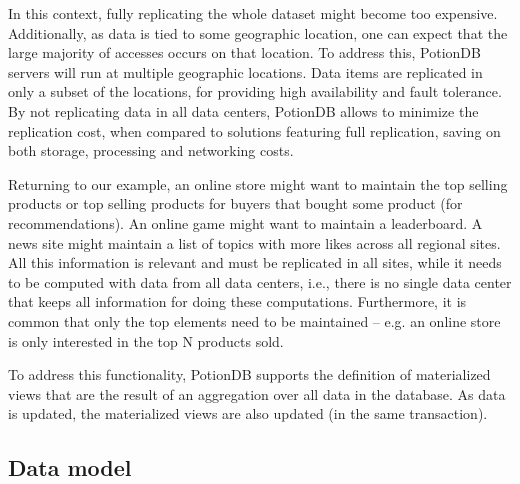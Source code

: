 \documentclass{vldb}
\begin{document}
In this context, fully replicating the whole dataset might become too expensive.
Additionally, as data is tied to some geographic location, one can expect that the large majority of accesses
occurs on that location. 
To address this, PotionDB servers will run at multiple geographic locations.
Data items are replicated in only a subset of the locations, for providing high availability and fault tolerance.
By not replicating data in all data centers, PotionDB allows to minimize the replication cost, when
compared to solutions featuring full replication, saving on both storage, processing and networking costs.

Returning to our example, an online store might want to maintain the top selling products or top selling products
for buyers that bought some product (for recommendations).
An online game might want to maintain a leaderboard. 
A news site might maintain a list of topics with more likes across all regional sites.
All this information is relevant and must be replicated in all sites, while it needs to be computed with 
data from all data centers, i.e., there is no single data center that keeps all information for doing
these computations. 
Furthermore, it is common that only the top elements need to be maintained -- e.g. an online store
is only interested in the top N products sold.

To address this functionality, PotionDB supports the definition of materialized views that 
are the result of an aggregation over all data in the database. As data is updated, the materialized 
views are also updated (in the same transaction). 


\subsection{Data model}
\label{subsec:datamodel}
\end{document}
